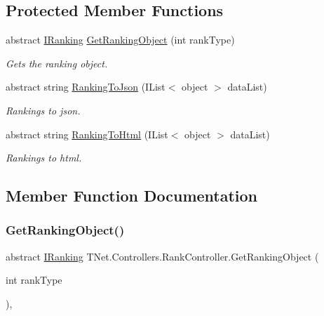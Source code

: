 \subsection*{Protected Member Functions}
\begin{DoxyCompactItemize}
\item 
abstract \mbox{\hyperlink{interface_t_net_1_1_com_1_1_rank_1_1_i_ranking}{I\+Ranking}} \mbox{\hyperlink{class_t_net_1_1_controllers_1_1_rank_controller_aec1afa4c5dedbebd41a32416f4f827b1}{Get\+Ranking\+Object}} (int rank\+Type)
\begin{DoxyCompactList}\small\item\em Gets the ranking object. \end{DoxyCompactList}\item 
abstract string \mbox{\hyperlink{class_t_net_1_1_controllers_1_1_rank_controller_a61adb0bb3db269494ac6c71f6a1f7c27}{Ranking\+To\+Json}} (I\+List$<$ object $>$ data\+List)
\begin{DoxyCompactList}\small\item\em Rankings to json. \end{DoxyCompactList}\item 
abstract string \mbox{\hyperlink{class_t_net_1_1_controllers_1_1_rank_controller_a453b81a53f72a30914f32ecded63dae2}{Ranking\+To\+Html}} (I\+List$<$ object $>$ data\+List)
\begin{DoxyCompactList}\small\item\em Rankings to html. \end{DoxyCompactList}\end{DoxyCompactItemize}


\subsection{Member Function Documentation}
\mbox{\label{class_t_net_1_1_controllers_1_1_rank_controller_aec1afa4c5dedbebd41a32416f4f827b1}} 
\subsubsection{\texorpdfstring{Get\+Ranking\+Object()}{GetRankingObject()}}
{\footnotesize\ttfamily abstract \mbox{\hyperlink{interface_t_net_1_1_com_1_1_rank_1_1_i_ranking}{I\+Ranking}} T\+Net.\+Controllers.\+Rank\+Controller.\+Get\+Ranking\+Object (\begin{DoxyParamCaption}\item[{int}]{rank\+Type }\end{DoxyParamCaption})\hspace{0.3cm}{\ttfamily [protected]}, {}}



